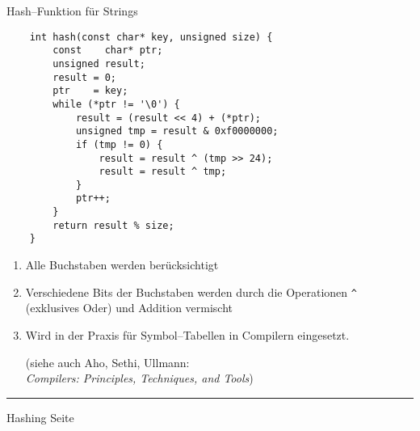 
\begin{slide}{}
\normalsize

\begin{center}
Hash--Funktion f\"ur Strings
\end{center}
\vspace*{0.5cm}

\footnotesize

\begin{verbatim}
    int hash(const char* key, unsigned size) {
        const    char* ptr;
        unsigned result;
        result = 0;
        ptr    = key;
        while (*ptr != '\0') {
            result = (result << 4) + (*ptr);
            unsigned tmp = result & 0xf0000000;
            if (tmp != 0) {
                result = result ^ (tmp >> 24);
                result = result ^ tmp;
            }
            ptr++;
        }
        return result % size;
    }
\end{verbatim}
\begin{enumerate}
\item Alle Buchstaben werden ber\"ucksichtigt
\item Verschiedene Bits der Buchstaben werden durch die Operationen 
      \texttt{\^} (exklusives Oder) und Addition vermischt
\item Wird in der Praxis f\"ur Symbol--Tabellen in Compilern
      eingesetzt.

      (siehe auch Aho, Sethi, Ullmann: \\[0.3cm]
      \hspace*{1.3cm} \emph{Compilers: Principles, Techniques, and Tools})
\end{enumerate}

\vspace*{\fill}
\tiny \addtocounter{mypage}{1}
\rule{17cm}{1mm}
Hashing  \hspace*{\fill} Seite 
\end{slide}



